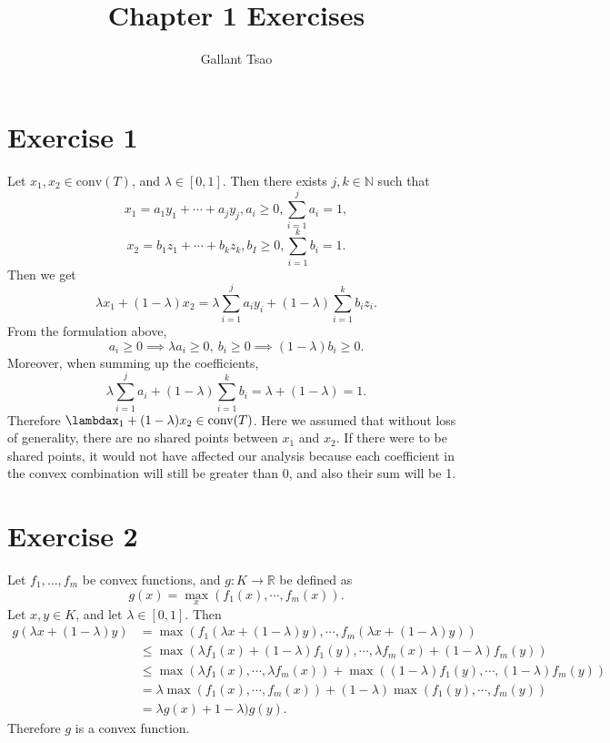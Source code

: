 \documentclass{article}
\title{Chapter 1 Exercises}
\author{Gallant Tsao}
\date{}
\begin{document}
\maketitle


\section*{Exercise 1}
Let $x_1, x_2 \in \text{conv}(T)$, and $\lambda \in [0, 1]$. Then there exists $j, k \in \mathbb{N}$ such that 
\[ x_1 = a_1 y_1 + \cdots + a_j y_j, a_i \geq 0, \sum_{i = 1}^{j} a_i = 1, \]
\[ x_2 = b_1 z_1 + \cdots + b_k z_k, b_I \geq 0, \sum_{i = 1}^{k} b_i = 1. \]
Then we get 
\[ \lambda x_1 + (1 - \lambda) x_2 
= \lambda \sum_{i = 1}^{j} a_i y_i + (1 - \lambda)\sum_{i = 1}^{k} b_i z_i. \]
From the formulation above, 
\[ a_i \geq 0 \implies \lambda a_i \geq 0, \ b_i \geq 0 \implies (1 - \lambda) b_i \geq 0. \]
Moreover, when summing up the coefficients, 
\[ \lambda \sum_{i = 1}^{j} a_i + (1 - \lambda) \sum_{i = 1}^{k} b_i = \lambda + (1 - \lambda) = 1. \]
Therefore $\lambdax_1 + (1 - \lambda)x_2 \in \text{conv}(T)$. Here we assumed that without loss of generality, there are no shared 
points between $x_1$ and $x_2$. If there were to be shared points, it would not have affected our analysis because each coefficient 
in the convex combination will still be greater than 0, and also their sum will be 1.


\newpage
\section*{Exercise 2}
Let $f_1, \dots, f_m$ be convex functions, and $g: K \to \mathbb{R}$ be defined as 
\[ g(x) = \max_{x}(f_1(x), \cdots, f_m(x)). \]
Let $x, y \in K$, and let $\lambda \in [0, 1]$. Then 
\begin{align*}
	g(\lambda x + (1 - \lambda)y) 
	&= \max_{}(f_1(\lambda x + (1 - \lambda)y), \cdots, f_m(\lambda x + (1 - \lambda)y)) \\
	&\leq \max_{}(\lambda f_1(x) + (1 - \lambda)f_1(y), \cdots, \lambda f_m(x) + (1 - \lambda) f_m(y)) \\
	&\leq \max_{}(\lambda f_1(x), \cdots, \lambda f_m(x)) + \max_{}((1 - \lambda)f_1(y), \cdots, (1 - \lambda)f_m(y)) \\
	&= \lambda \max_{}(f_1(x), \cdots, f_m(x)) + (1 - \lambda) \max_{}(f_1(y), \cdots, f_m(y)) \\
	&= \lambda g(x) + 1 - \lambda) g(y).
\end{align*}
Therefore $g$ is a convex function.
\end{document}
